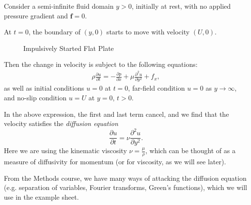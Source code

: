 \documentclass[12pt]{article}
\begin{document}
Consider a semi-infinite fluid domain $y > 0$, initially at rest, with no applied pressure gradient and $\mathbf{f} = 0$.

At $t = 0$, the boundary of $(y, 0)$ starts to move with velocity $(U, 0)$.

\begin{figure}[h]
	\centering
	\caption{Impulsively Started Flat Plate}
	\label{fig:impulsive_plate}
\end{figure}

Then the change in velocity is subject to the following equations:
\begin{align*}
	\rho \frac{\partial u}{\partial t} = - \frac{\partial p}{\partial x} + \mu \frac{\partial^2 u}{\partial y^2} + f_x,
\end{align*}
as well as initial conditions $u = 0$ at $t = 0$, far-field condition $u = 0$ as $y \to \infty$, and no-slip condition $u = U$ at $y = 0$, $t > 0$.

In the above expression, the first and last term cancel, and we find that the velocity satisfies the \emph{diffusion equation}
\[
\frac{\partial u}{\partial t} = \nu \frac{\partial^2 u}{\partial y^2}
.\]
Here we are using the kinematic viscosity $\nu = \frac{\mu}{\rho}$, which can be thought of as a measure of diffusivity for momentum (or for viscosity, as we will see later).

From the Methods course, we have many ways of attacking the diffusion equation (e.g. separation of variables, Fourier transforms, Green's functions), which we will use in the example sheet.
\end{document}
